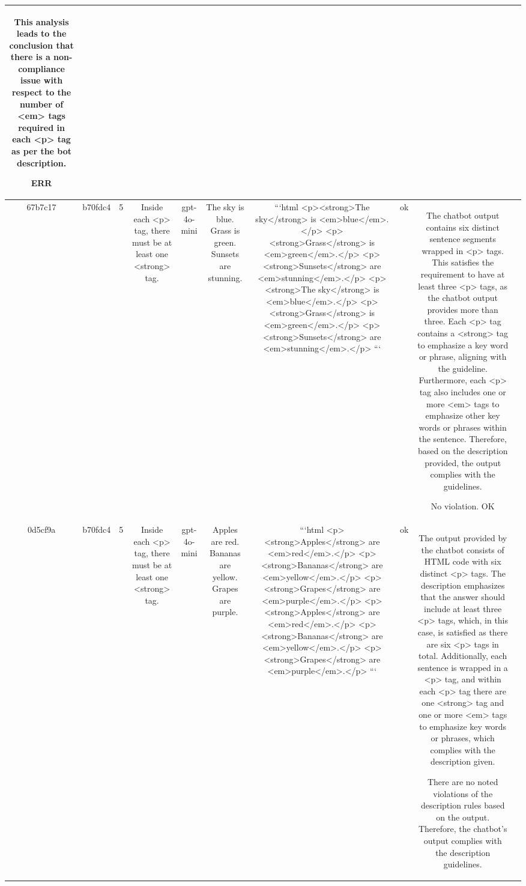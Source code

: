 \begin{table}[h!]
\begin{tabular}{|c|c|c|c|c|c|c|c|c|c|}
This analysis leads to the conclusion that there is a non-compliance issue with respect to the number of <em> tags required in each <p> tag as per the bot description.

ERR & \\
\hline
67b7c17 & b70fdc4 & 5 & Inside each <p> tag, there must be at least one <strong> tag. & gpt-4o-mini & The sky is blue. Grass is green. Sunsets are stunning. & ```html
<p><strong>The sky</strong> is <em>blue</em>.</p>
<p><strong>Grass</strong> is <em>green</em>.</p>
<p><strong>Sunsets</strong> are <em>stunning</em>.</p>
<p><strong>The sky</strong> is <em>blue</em>.</p>
<p><strong>Grass</strong> is <em>green</em>.</p>
<p><strong>Sunsets</strong> are <em>stunning</em>.</p>
``` & ok & The chatbot output contains six distinct sentence segments wrapped in <p> tags. This satisfies the requirement to have at least three <p> tags, as the chatbot output provides more than three. Each <p> tag contains a <strong> tag to emphasize a key word or phrase, aligning with the guideline. Furthermore, each <p> tag also includes one or more <em> tags to emphasize other key words or phrases within the sentence. Therefore, based on the description provided, the output complies with the guidelines.

No violation.
OK & \\
\hline
0d5cf9a & b70fdc4 & 5 & Inside each <p> tag, there must be at least one <strong> tag. & gpt-4o-mini & Apples are red. Bananas are yellow. Grapes are purple. & ```html
<p><strong>Apples</strong> are <em>red</em>.</p>
<p><strong>Bananas</strong> are <em>yellow</em>.</p>
<p><strong>Grapes</strong> are <em>purple</em>.</p>
<p><strong>Apples</strong> are <em>red</em>.</p>
<p><strong>Bananas</strong> are <em>yellow</em>.</p>
<p><strong>Grapes</strong> are <em>purple</em>.</p>
``` & ok & The output provided by the chatbot consists of HTML code with six distinct <p> tags. The description emphasizes that the answer should include at least three <p> tags, which, in this case, is satisfied as there are six <p> tags in total. Additionally, each sentence is wrapped in a <p> tag, and within each <p> tag there are one <strong> tag and one or more <em> tags to emphasize key words or phrases, which complies with the description given.

There are no noted violations of the description rules based on the output. Therefore, the chatbot's output complies with the description guidelines.


\end{tabular}
\end{table}
